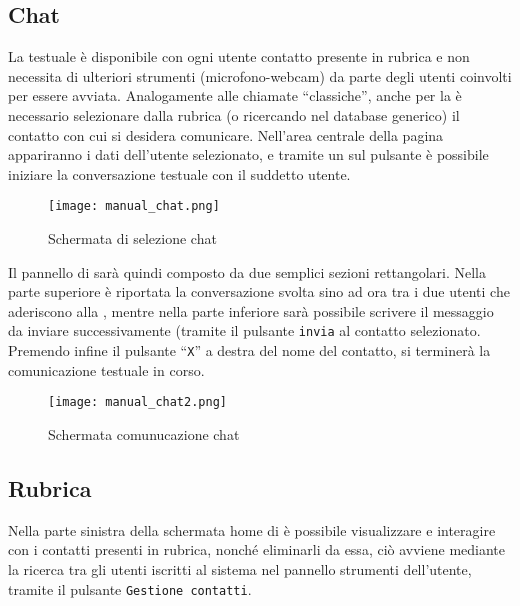 \clearpage
\subsection{Chat}
La  testuale è disponibile con ogni utente contatto presente in rubrica e non necessita di ulteriori strumenti (microfono-webcam) da parte degli utenti coinvolti per essere avviata. Analogamente alle chiamate ``classiche'', anche per la  è necessario selezionare dalla rubrica (o ricercando nel database generico)  il contatto con cui si desidera comunicare. Nell'area centrale della pagina appariranno i dati dell'utente selezionato, e tramite un  sul pulsante  è possibile iniziare la conversazione testuale con il suddetto utente.\\

\begin{figure}[H]
  \centering
  \texttt{[image: manual\_chat.png]}
\caption{Schermata di selezione chat}\label{fig:chat}
\end{figure}

Il pannello di  sarà quindi composto da due semplici sezioni rettangolari. Nella parte superiore è riportata la conversazione svolta sino ad ora tra i due utenti che aderiscono alla , mentre nella parte inferiore sarà possibile scrivere il messaggio da inviare successivamente (tramite il pulsante \texttt{invia} al contatto selezionato.\\
Premendo infine il pulsante ``\texttt{X}'' a destra del nome del contatto, si terminerà la comunicazione testuale in corso.

\begin{figure}[H]
  \centering
  \texttt{[image: manual\_chat2.png]}
\caption{Schermata comunucazione chat}\label{fig:chat2}
\end{figure}

\clearpage
\subsection{Rubrica}
Nella parte sinistra della schermata home di \caName{} è possibile visualizzare e interagire con i contatti presenti in rubrica, nonché eliminarli da essa, ciò avviene mediante la ricerca tra gli utenti iscritti al sistema nel pannello strumenti dell'utente, tramite il pulsante \texttt{Gestione contatti}.

